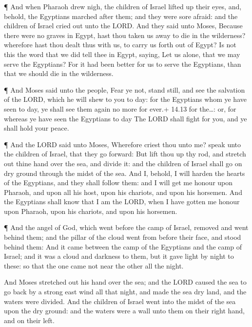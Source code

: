  ¶ And when Pharaoh drew nigh, the children of Israel
lifted up their eyes, and, behold, the Egyptians marched after them; and
they were sore afraid: and the children of Israel cried out unto the
LORD.  And they said unto Moses, Because there were no
graves in Egypt, hast thou taken us away to die in the wilderness?
wherefore hast thou dealt thus with us, to carry us forth out of Egypt?
 Is not this the word that we did tell thee in Egypt,
saying, Let us alone, that we may serve the Egyptians? For it had been
better for us to serve the Egyptians, than that we should die in the
wilderness.

 ¶ And Moses said unto the people, Fear ye not, stand
still, and see the salvation of the LORD, which he will shew to you to
day: for the Egyptians whom ye have seen to day, ye shall see them again
no more for ever.+ 14.13 for the\ldots: or, for whereas ye have seen the
Egyptians to day  The LORD shall fight for you, and ye
shall hold your peace.

 ¶ And the LORD said unto Moses, Wherefore criest thou unto
me? speak unto the children of Israel, that they go forward:
 But lift thou up thy rod, and stretch out thine hand over
the sea, and divide it: and the children of Israel shall go on dry
ground through the midst of the sea.  And I, behold, I will
harden the hearts of the Egyptians, and they shall follow them: and I
will get me honour upon Pharaoh, and upon all his host, upon his
chariots, and upon his horsemen.  And the Egyptians shall
know that I am the LORD, when I have gotten me honour upon Pharaoh, upon
his chariots, and upon his horsemen.

 ¶ And the angel of God, which went before the camp of
Israel, removed and went behind them; and the pillar of the cloud went
from before their face, and stood behind them:  And it came
between the camp of the Egyptians and the camp of Israel; and it was a
cloud and darkness to them, but it gave light by night to these: so that
the one came not near the other all the night.

 And Moses stretched out his hand over the sea; and the
LORD caused the sea to go back by a strong east wind all that night, and
made the sea dry land, and the waters were divided.  And
the children of Israel went into the midst of the sea upon the dry
ground: and the waters were a wall unto them on their right hand, and on
their left.

